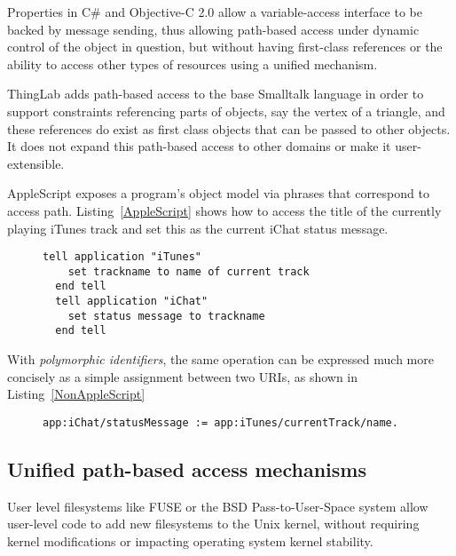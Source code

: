 \documentclass[preprint,authoryear]{acm_proc_article-sp}
\begin{document}
Properties in C\# and Objective-C 2.0 allow a variable-access interface to be backed by 
message sending, thus allowing path-based access under dynamic control of the object
in question, but without having first-class references or the ability to access other
types of resources using a unified mechanism.

ThingLab\cite{thinglab}  adds path-based access to the base Smalltalk language in order to support
constraints referencing parts of objects, say the vertex of a triangle, and these
references do exist as first class objects that can be passed to other objects.
   It does not
expand this path-based access to other domains or make it user-extensible.

AppleScript\cite{applescript-hopl3} exposes a program's object model via
phrases that correspond to access path.  Listing~\ref{AppleScript} shows 
how to access the title of the currently playing iTunes track and set this
as the current iChat status message.

\begin{figure}[htbp]
\begin{lstlisting}[style=L,label= AppleScript,caption=Using AppleScript to set chat status from track name.]
  tell application "iTunes"
    set trackname to name of current track
  end tell
  tell application "iChat"
    set status message to trackname
  end tell
\end{lstlisting}
\end{figure}

With \emph{polymorphic identifiers}, the same operation can be expressed
much more concisely as a simple assignment between two URIs,
as shown in Listing~\ref{NonAppleScript}


\begin{figure}[htbp]
\begin{lstlisting}[style=L,label=NonAppleScript,caption=Access to applications via \emph{polymorphic identifiers}.]
  app:iChat/statusMessage := app:iTunes/currentTrack/name.
\end{lstlisting}
\end{figure}


\subsection{Unified path-based access mechanisms}


User level filesystems like FUSE\cite{fuse} or the BSD Pass-to-User-Space\cite{puffs} 
system allow
user-level code to add new filesystems to the Unix kernel, without requiring
kernel modifications or impacting operating system kernel stability.
\end{document}
